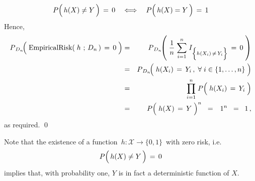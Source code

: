 \begin{equation*}
P\!\left(\,h(X) \overset{{\color{white}.}}{\neq} Y \,\right) \,=\, 0
\quad\Longleftrightarrow\quad
P\!\left(\,h(X) \overset{{\color{white}-}}{=} Y \,\right) \,=\, 1
\end{equation*}
Hence,
\begin{eqnarray*}
P_{\,D_{n}}\!\!\left(\;
	\textnormal{EmpiricalRisk}(\;h\,\overset{{\color{white}-}}{;}\,D_{n}\,) \,=\, 0
	\;\right)
& = &
	P_{\,D_{n}}\!\!\left(\;
		\dfrac{1}{n}\;\overset{n}{\underset{i=1}{\sum}}\;
		I_{\left\{h(X_{i}) \,\overset{{\color{white}.}}{\neq}\, Y_{i}\right\}} \,=\, 0
		\;\right)
\\
& = &
	P_{\,D_{n}}\!\!\left(\;
		h(X_{i}) \,\overset{{\color{white}-}}{=}\, Y_{i}\,,\;\forall\;i\in\{1,\ldots,n\}
		\;\right)
\\
& = &
	\overset{n}{\underset{i=1}{\prod}}\;
	P\!\left(\; h(X_{i}) \,\overset{{\color{white}-}}{=}\, Y_{i} \;\right)
\\
& = &
	P\!\left(\; h(X) \,\overset{{\color{white}-}}{=}\, Y \;\right)^{n}
	\;\; = \;\;\, 1^{n} \;\; = \;\; 1\,,
\end{eqnarray*}
as required.
\qed

\begin{remark}
\mbox{}\vskip 0.1cm
\noindent
Note that the existence of a function \,$h : \mathcal{X} \longrightarrow \{0,1\}$\,
with zero risk, i.e.
\begin{equation*}
P\!\left(\,h(X) \overset{{\color{white}.}}{\neq} Y \,\right) \,=\, 0
\end{equation*}
implies that, with probability one, $Y$ is in fact a deterministic function of $X$.
\end{remark}




\renewcommand{\theenumi}{\roman{enumi}}
\renewcommand{\labelenumi}{\textnormal{(\theenumi)}$\;\;$}

